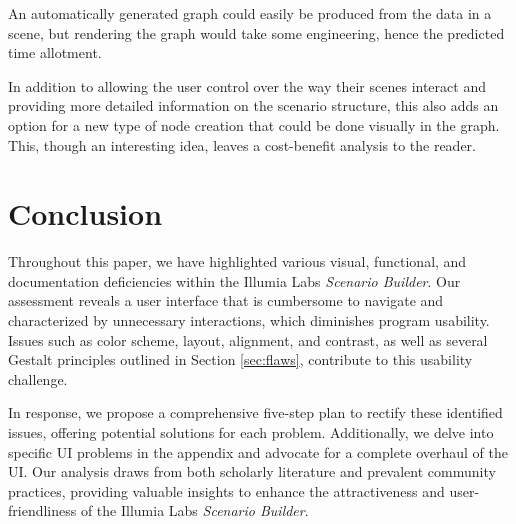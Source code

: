 \documentclass[sigart]{acmart_mod} %
\begin{document}
An automatically generated graph could easily be produced from the data in a scene, but rendering the graph would take some engineering, hence the predicted time allotment.

In addition to allowing the user control over the way their scenes interact and providing more detailed information on the scenario structure, this also adds an option for a new type of node creation that could be done visually in the graph. This, though an interesting idea, leaves a cost-benefit analysis to the reader.

\section{Conclusion}

Throughout this paper, we have highlighted various visual, functional, and documentation deficiencies within the Illumia Labs \textit{Scenario Builder}. Our assessment reveals a user interface that is cumbersome to navigate and characterized by unnecessary interactions, which diminishes program usability. Issues such as color scheme, layout, alignment, and contrast, as well as several Gestalt principles outlined in Section \ref{sec:flaws}, contribute to this usability challenge.

In response, we propose a comprehensive five-step plan to rectify these identified issues, offering potential solutions for each problem. Additionally, we delve into specific UI problems in the appendix and advocate for a complete overhaul of the UI. Our analysis draws from both scholarly literature and prevalent community practices, providing valuable insights to enhance the attractiveness and user-friendliness of the Illumia Labs \textit{Scenario Builder}.


\end{document}
